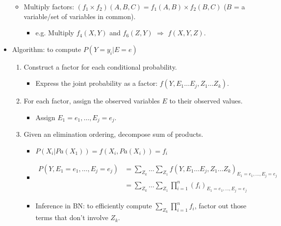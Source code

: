 \documentclass{article}
\begin{document}
\begin{itemize}
\begin{itemize}
\begin{itemize}
                \end{itemize}
            \item Multiply factors: $(f_1 \times f_2)(A, B, C) = f_1(A, B) \times f_2(B, C)$ ($B$ = a variable/set of variables in common).
                \begin{itemize}
                    \item e.g. Multiply $f_4(X, Y)$ and $f_6(Z, Y)$ $\Rightarrow$ $f(X, Y, Z)$.
                \end{itemize}
        \end{itemize}
    \item Algorithm: to compute $P(Y=y_i|E=e)$
        \begin{enumerate}
            \item Construct a factor for each conditional probability.
                \begin{itemize}
                    \item Express the joint probability as a factor: $f(Y, E_1 \ldots E_j, Z_1 \ldots Z_k)$.
                \end{itemize}
            \item For each factor, assign the observed variables $E$ to their observed values.
                \begin{itemize}
                     \item Assign $E_1 = e_1, \ldots, E_j = e_j$.
                \end{itemize}
            \item Given an elimination ordering, decompose sum of products.
                \begin{itemize}
                    \item $P(X_i|Pa(X_1)) = f(X_i, Pa(X_i)) = f_i$
                    \item
                        \begin{align*}
                            P(Y, E_1 = e_1, \ldots, E_j = e_j) &= \sum\limits_{Z_k} \dots \sum\limits_{Z_1} f(Y, E_1 \ldots E_j, Z_1 \ldots Z_k)_{E_1 = e_1, \ldots, E_j = e_j} \\
                            &= \sum\limits_{Z_k} \dots \sum\limits_{Z_1} \prod\limits_{i=1}^{n} (f_i)_{E_1 = e_1, \ldots, E_j = e_j}
                        \end{align*}
                    \item Inference in BN: to efficiently compute $\sum\limits_{Z_k} \prod\limits_{i=1}^{n} f_i$, factor out those terms that don't involve $Z_k$.

\end{itemize}
\end{enumerate}
\end{itemize}
\end{document}
